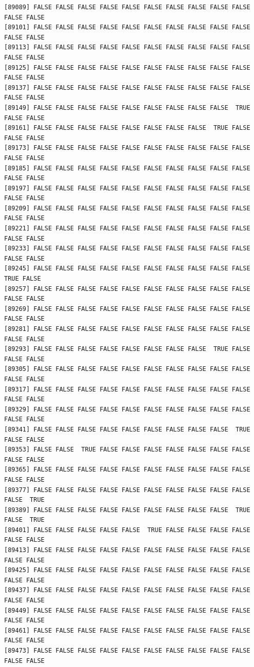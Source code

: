 \documentclass[
  a4paper,
  DIV=11,
  numbers=noendperiod]{scrartcl}
\begin{document}
\begin{verbatim}
[89089] FALSE FALSE FALSE FALSE FALSE FALSE FALSE FALSE FALSE FALSE FALSE FALSE
[89101] FALSE FALSE FALSE FALSE FALSE FALSE FALSE FALSE FALSE FALSE FALSE FALSE
[89113] FALSE FALSE FALSE FALSE FALSE FALSE FALSE FALSE FALSE FALSE FALSE FALSE
[89125] FALSE FALSE FALSE FALSE FALSE FALSE FALSE FALSE FALSE FALSE FALSE FALSE
[89137] FALSE FALSE FALSE FALSE FALSE FALSE FALSE FALSE FALSE FALSE FALSE FALSE
[89149] FALSE FALSE FALSE FALSE FALSE FALSE FALSE FALSE FALSE  TRUE FALSE FALSE
[89161] FALSE FALSE FALSE FALSE FALSE FALSE FALSE FALSE  TRUE FALSE FALSE FALSE
[89173] FALSE FALSE FALSE FALSE FALSE FALSE FALSE FALSE FALSE FALSE FALSE FALSE
[89185] FALSE FALSE FALSE FALSE FALSE FALSE FALSE FALSE FALSE FALSE FALSE FALSE
[89197] FALSE FALSE FALSE FALSE FALSE FALSE FALSE FALSE FALSE FALSE FALSE FALSE
[89209] FALSE FALSE FALSE FALSE FALSE FALSE FALSE FALSE FALSE FALSE FALSE FALSE
[89221] FALSE FALSE FALSE FALSE FALSE FALSE FALSE FALSE FALSE FALSE FALSE FALSE
[89233] FALSE FALSE FALSE FALSE FALSE FALSE FALSE FALSE FALSE FALSE FALSE FALSE
[89245] FALSE FALSE FALSE FALSE FALSE FALSE FALSE FALSE FALSE FALSE  TRUE FALSE
[89257] FALSE FALSE FALSE FALSE FALSE FALSE FALSE FALSE FALSE FALSE FALSE FALSE
[89269] FALSE FALSE FALSE FALSE FALSE FALSE FALSE FALSE FALSE FALSE FALSE FALSE
[89281] FALSE FALSE FALSE FALSE FALSE FALSE FALSE FALSE FALSE FALSE FALSE FALSE
[89293] FALSE FALSE FALSE FALSE FALSE FALSE FALSE FALSE  TRUE FALSE FALSE FALSE
[89305] FALSE FALSE FALSE FALSE FALSE FALSE FALSE FALSE FALSE FALSE FALSE FALSE
[89317] FALSE FALSE FALSE FALSE FALSE FALSE FALSE FALSE FALSE FALSE FALSE FALSE
[89329] FALSE FALSE FALSE FALSE FALSE FALSE FALSE FALSE FALSE FALSE FALSE FALSE
[89341] FALSE FALSE FALSE FALSE FALSE FALSE FALSE FALSE FALSE  TRUE FALSE FALSE
[89353] FALSE FALSE  TRUE FALSE FALSE FALSE FALSE FALSE FALSE FALSE FALSE FALSE
[89365] FALSE FALSE FALSE FALSE FALSE FALSE FALSE FALSE FALSE FALSE FALSE FALSE
[89377] FALSE FALSE FALSE FALSE FALSE FALSE FALSE FALSE FALSE FALSE FALSE  TRUE
[89389] FALSE FALSE FALSE FALSE FALSE FALSE FALSE FALSE FALSE  TRUE FALSE  TRUE
[89401] FALSE FALSE FALSE FALSE FALSE  TRUE FALSE FALSE FALSE FALSE FALSE FALSE
[89413] FALSE FALSE FALSE FALSE FALSE FALSE FALSE FALSE FALSE FALSE FALSE FALSE
[89425] FALSE FALSE FALSE FALSE FALSE FALSE FALSE FALSE FALSE FALSE FALSE FALSE
[89437] FALSE FALSE FALSE FALSE FALSE FALSE FALSE FALSE FALSE FALSE FALSE FALSE
[89449] FALSE FALSE FALSE FALSE FALSE FALSE FALSE FALSE FALSE FALSE FALSE FALSE
[89461] FALSE FALSE FALSE FALSE FALSE FALSE FALSE FALSE FALSE FALSE FALSE FALSE
[89473] FALSE FALSE FALSE FALSE FALSE FALSE FALSE FALSE FALSE FALSE FALSE FALSE

\end{verbatim}
\end{document}

